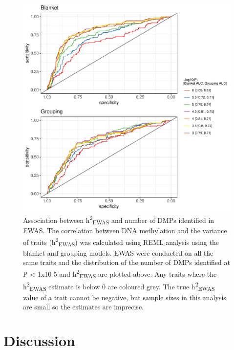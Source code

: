 \documentclass[11pt,oneside]{bristolthesis}
\begin{document}
\begin{figure}

{\centering \includegraphics[width=1\linewidth]{figure/05-h2ewas/roc_plot} 

}

\caption{Association between h\textsuperscript{2}\textsubscript{EWAS} and number of DMPs identified in EWAS. The correlation between DNA methylation and the variance of traits (h\textsuperscript{2}\textsubscript{EWAS}) was calculated using REML analysis using the blanket and grouping models. EWAS were conducted on all the same traits and the distribution of the number of DMPs identified at P \textless{} 1x10-5 and h\textsuperscript{2}\textsubscript{EWAS} are plotted above. Any traits where the h\textsuperscript{2}\textsubscript{EWAS} estimate is below 0 are coloured grey. The true h\textsuperscript{2}\textsubscript{EWAS} value of a trait cannot be negative, but sample sizes in this analysis are small so the estimates are imprecise.}\label{fig:h2ewas-dmp-roc-curve}
\end{figure}
\hypertarget{discussion-05}{%
\section{Discussion}\label{discussion-05}}
\end{document}
